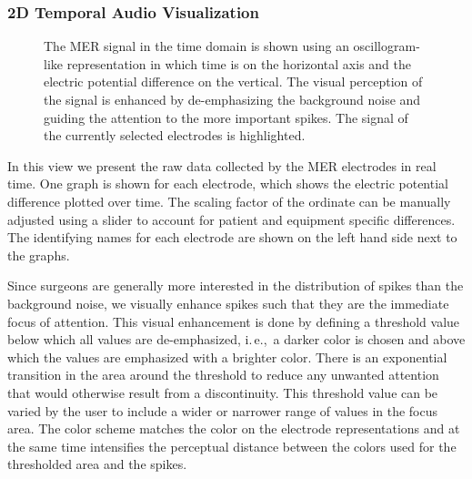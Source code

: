 \documentclass[review]{vgtc}                 %
\begin{document}
\subsubsection{2D Temporal Audio Visualization}\label{sec:overview:recording:mer}
\begin{figure}[b]
    \centering
    \caption{The MER signal in the time domain is shown using an oscillogram-like representation in which time is on the horizontal axis and the electric potential difference on the vertical. The visual perception of the signal is enhanced by de-emphasizing the background noise and guiding the attention to the more important spikes. The signal of the currently selected electrodes is highlighted.}
    \label{fig:recordingphase:sound}
\end{figure}

In this view we present the raw data collected by the MER electrodes in real time. One graph is shown for each electrode, which shows the electric potential difference plotted over time. The scaling factor of the ordinate can be manually adjusted using a slider to account for patient and equipment specific differences. The identifying names for each electrode are shown on the left hand side next to the graphs.

Since surgeons are generally more interested in the distribution of spikes than the background noise, we visually enhance spikes such that they are the immediate focus of attention. This visual enhancement is done by defining a threshold value below which all values are de-emphasized, i.\,e.,~a darker color is chosen and above which the values are emphasized with a brighter color. There is an exponential transition in the area around the threshold to reduce any unwanted attention that would otherwise result from a discontinuity. This threshold value can be varied by the user to include a wider or narrower range of values in the focus area. The color scheme matches the color on the electrode representations and at the same time intensifies the perceptual distance between the colors used for the thresholded area and the spikes.
\end{document}
